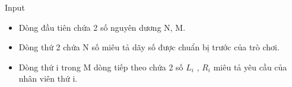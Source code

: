 Input
\begin{itemize}
	\item Dòng đầu tiên chứa 2 số nguyên dương N, M.
	\item Dòng thứ 2 chứa N số miêu tả dãy số được chuẩn bị trước của trò chơi.
	\item Dòng thứ i trong M dòng tiếp theo chứa 2 số $L_{i}$ , $R_{i}$ miêu tả yêu cầu của nhân viên thứ i.
\end{itemize}